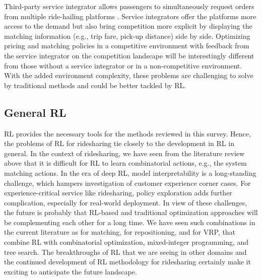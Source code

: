 \documentclass{article}
\newcommand{\tq}[1]{\textcolor{red}{#1}}
\begin{document}
Third-party service integrator allows passengers to simultaneously request orders from multiple ride-hailing platforms \citep{zhou2020competitive}. Service integrators offer the platforms more access to the demand but also bring competition more explicit by displaying the matching information (e.g., trip fare, pick-up distance) side by side. Optimizing pricing and matching policies in a competitive environment with feedback from the service integrator on the competition landscape will be interestingly different from those without a service integrator or in a non-competitive environment. With the added environment complexity, these problems are challenging to solve by traditional methods and could be better tackled by RL. 



\subsection{General RL}
RL provides the necessary tools for the methods reviewed in this survey. Hence, the problems of RL for ridesharing tie closely to the development in RL in general. In the context of ridesharing, we have seen from the literature review above that it is difficult for RL to learn combinatorial actions, e.g., the system matching actions. In the era of deep RL, model interpretability is a long-standing challenge, which hampers investigation of customer experience corner cases. For experience-critical service like ridesharing, policy exploration adds further complication, especially for real-world deployment.
In view of these challenges, the future is probably that RL-based and traditional optimization approaches will be complementing each other for a long time. We have seen such combinations in the current literature as \citep{xu2018large,qin2021reinforcement} for matching, \citep{chaudhari2020learn,jtq2021repos} for repositioning, and \citep{delarue2020reinforcement} for VRP, that combine RL with combinatorial optimization, mixed-integer programming, and tree search. 
The breakthroughs of RL that we are seeing in other domains and the continued development of RL methodology for ridesharing certainly make it exciting to anticipate the future landscape.
\end{document}
